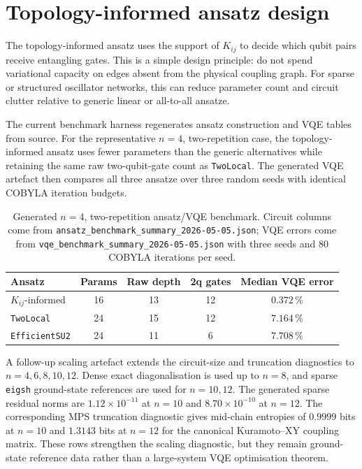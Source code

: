 \documentclass[preprint,aps,physrev,superscriptaddress,floatfix,longbibliography]{revtex4-2}
\begin{document}
\section{Topology-informed ansatz design}

The topology-informed ansatz uses the support of $K_{ij}$ to decide which
qubit pairs receive entangling gates. This is a simple design principle:
do not spend variational capacity on edges absent from the physical
coupling graph. For sparse or structured oscillator networks, this can
reduce parameter count and circuit clutter relative to generic linear or
all-to-all ansatze.

The current benchmark harness regenerates ansatz construction and VQE
tables from source. For the representative $n=4$, two-repetition case,
the topology-informed ansatz uses fewer parameters than the generic
alternatives while retaining the same raw two-qubit-gate count as
\texttt{TwoLocal}. The generated VQE artefact then compares all three
ansatze over three random seeds with identical COBYLA iteration budgets.

\begin{table}[tb]
\centering
\small
\begin{tabular}{lcccc}
\toprule
Ansatz & Params & Raw depth & 2q gates & Median VQE error \\
\midrule
$K_{ij}$-informed & 16 & 13 & 12 & $0.372\,\%$ \\
\texttt{TwoLocal} & 24 & 15 & 12 & $7.164\,\%$ \\
\texttt{EfficientSU2} & 24 & 11 & 6 & $7.708\,\%$ \\
\bottomrule
\end{tabular}
\caption{Generated $n=4$, two-repetition ansatz/VQE benchmark. Circuit
columns come from
\texttt{ansatz\_benchmark\_summary\_2026-05-05.json};
VQE errors come from
\texttt{vqe\_benchmark\_summary\_2026-05-05.json}
with three seeds and 80 COBYLA iterations per seed.}
\label{tab:ansatz}
\end{table}

A follow-up scaling artefact extends the circuit-size and truncation
diagnostics to $n=4,6,8,10,12$. Dense exact diagonalisation is used up to
$n=8$, and sparse \texttt{eigsh} ground-state references are used for
$n=10,12$. The generated sparse residual norms are
$1.12\times10^{-11}$ at $n=10$ and $8.70\times10^{-10}$ at $n=12$.
The corresponding MPS truncation diagnostic gives mid-chain entropies of
$0.9999$ bits at $n=10$ and $1.3143$ bits at $n=12$ for the canonical
Kuramoto--XY coupling matrix. These rows strengthen the scaling
diagnostic, but they remain ground-state reference data rather than a
large-system VQE optimisation theorem.
\end{document}

